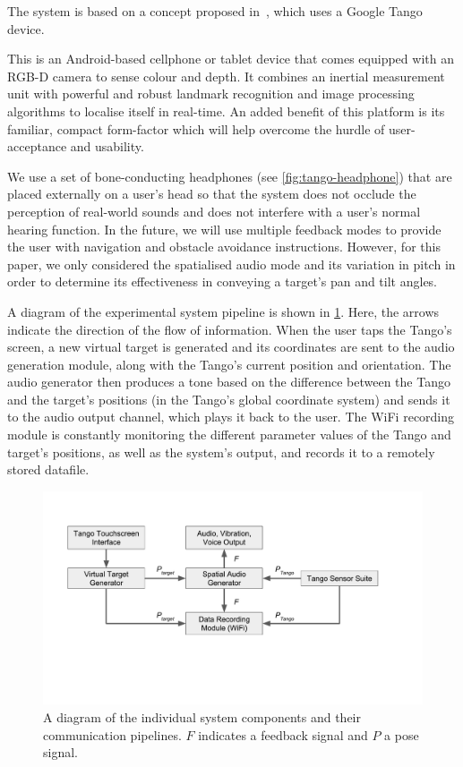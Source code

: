 \documentclass[sigconf, review=true, screen=true, anonymous=true]{acmart}
\begin{document}
\begin{anonsuppress}
The system is based on a concept proposed in~\cite{bellotto2013, lock2017portable}, which uses a Google Tango device.
\end{anonsuppress}
This is an Android-based cellphone or tablet device that comes equipped with an RGB-D camera to sense colour and depth.
It combines an inertial measurement unit with powerful and robust landmark recognition and image processing algorithms to localise itself in real-time.
An added benefit of this platform is its familiar, compact form-factor which will help overcome the hurdle of user-acceptance and usability.

We use a set of bone-conducting headphones (see \cref{fig:tango-headphone}) that are placed externally on a user's head so that the system does not occlude the perception of real-world sounds and does not interfere with a user's normal hearing function.
In the future, we will use multiple feedback modes to provide the user with navigation and obstacle avoidance instructions.
However, for this paper, we only considered the spatialised audio mode and its variation in pitch in order to determine its effectiveness in conveying a target's pan and tilt angles.

A diagram of the experimental system pipeline is shown in \cref{fig:pipeline}.
Here, the arrows indicate the direction of the flow of information.
When the user taps the Tango's screen, a new virtual target is generated and its coordinates are sent to the audio generation module, along with the Tango's current position and orientation.
The audio generator then produces a tone based on the difference between the Tango and the target's positions (in the Tango's global coordinate system) and sends it to the audio output channel, which plays it back to the user.
The WiFi recording module is constantly monitoring the different parameter values of the Tango and target's positions, as well as the system's output, and records it to a remotely stored datafile. 

\begin{figure}
  \centering
  \includegraphics[clip=true, trim=0 120 80 50, width=1.0\columnwidth]{figures/pipeline.pdf}
  \caption{A diagram of the individual system components and their communication pipelines. $F$ indicates a feedback signal and $P$ a pose signal. }\label{fig:pipeline}
\end{figure}
\end{document}
